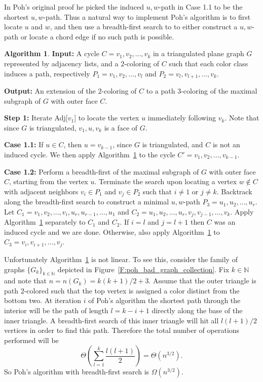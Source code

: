 \documentclass[12pt,letterpaper]{article}
\theoremstyle{plain}
\theoremstyle{definition}
\theoremstyle{break}
\newtheorem{algorithm}[lemma]{Algorithm}     %
\begin{document}
In Poh's original proof he picked the induced $u,w$-path in Case 1.1 to be the
shortest $u,w$-path.
Thus a natural way to implement Poh's algorithm is to first locate $u$ and $w$,
and then use a breadth-first search to
to either construct a $u,w$-path or locate
a chord edge if no such path is possible.

\begin{algorithm}\label{A:poh_bfs}
\textbf{Input:} A cycle $C=v_1,v_2,\ldots,v_k$ in a triangulated plane
graph $G$ represented by adjacency lists, and a $2$-coloring of $C$ such
that each color class induces a path, respectively $P_1=v_1,v_2,\ldots,v_l$ and
$P_2=v_l,v_{l+1},\ldots,v_k$.

\noindent\textbf{Output:} An extension of the $2$-coloring of $C$ to a path
$3$-coloring of the maximal subgraph of $G$ with outer face $C$.

\noindent\textbf{Step 1:} Iterate Adj[$v_1$] to locate the vertex $u$
immediately following $v_k$. Note that since $G$ is triangulated, $v_1,u,v_k$ is
a face of $G$.

\noindent\textbf{Case 1.1:} If $u\in C$, then $u=v_{k-1}$, since $G$ is
triangulated, and $C$ is not an induced cycle. We then
apply Algorithm~\ref{A:poh_bfs} to the cycle $C'=v_1,v_2,\ldots,v_{k-1}$.

\noindent\textbf{Case 1.2:} Perform a breadth-first of the maximal subgraph of
$G$ with outer face $C$, starting from the
vertex $u$. Terminate the search upon locating a vertex $w\not\in C$ with adjacent
neighbors $v_i\in P_1$ and $v_j\in P_2$ such that $i\ne 1$ or $j\ne k$.
Backtrack along the breadth-first search
to construct a minimal $u,w$-path $P_3=u_1,u_2,\ldots,u_r$. Let
$C_1=v_1,v_2,\ldots,v_i,u_r,u_{r-1},\ldots,u_1$ and
$C_2=u_1,u_2,\ldots,u_r,v_j,v_{j-1},\ldots,v_k$. Apply Algorithm~\ref{A:poh_bfs}
separately to $C_1$ and $C_2$. If $i=l$ and $j={l+1}$ then $C$ was an induced
cycle and we are done. Otherwise, also apply Algorithm~\ref{A:poh_bfs} to
$C_3=v_i,v_{i+1},\ldots,v_j$.
\end{algorithm}

Unfortunately Algorithm~\ref{A:poh_bfs}
is not linear. To see this, consider the family of
graphs $\{G_k\}_{k\in\mathbb{N}}$ depicted in
Figure~\ref{F:poh_bad_graph_collection}. Fix $k\in\mathbb{N}$ and note that
$n=n(G_k)=k(k+1)/2+3$. Assume
that the outer triangle is path $2$-colored such that the top vertex is
assigned a color distinct from the bottom two. At iteration $i$ of Poh's
algorithm the shortest path through the interior will be the path of length
$l=k-i+1$ directly along the base of the inner triangle. A breadth-first search
of this inner triangle will hit all $l(l+1)/2$ vertices in order to find this
path. Therefore the total number of operations performed will be
\[
    \Theta\left( \sum_{l=1}^k\frac{l(l+1)}{2} \right)=\Theta(n^{3/2}).
\]
So Poh's algorithm with breadth-first search is $\Omega(n^{3/2})$.
\end{document}
